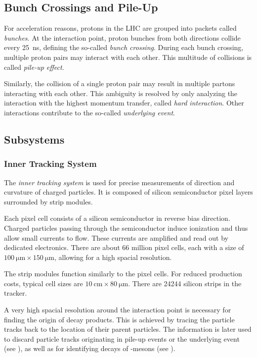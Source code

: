 \subsection{Bunch Crossings and Pile-Up}
\label{sec:pileup}

For acceleration reasons, protons in the \ac{LHC} are grouped into packets called \emph{bunches}. At the interaction point, proton bunches from both directions collide every \SI{25}{\nano\second}, defining the so-called \emph{bunch crossing}. During each bunch crossing, multiple proton pairs may interact with each other. This multitude of collisions is called \emph{pile-up effect}.

Similarly, the collision of a single proton pair may result in multiple partons interacting with each other. This ambiguity is resolved by only analyzing the interaction with the highest momentum transfer, called \emph{hard interaction}. Other interactions contribute to the so-called \emph{underlying event}.

\subsection{Subsystems}
\subsubsection{Inner Tracking System}
The \emph{inner tracking system} is used for precise measurements of direction and curvature of charged particles. 
It is composed of silicon semiconductor pixel layers surrounded by strip modules.

Each pixel cell consists of a silicon semiconductor in reverse bias direction. Charged particles passing through the semiconductor induce ionization and thus allow small currents to flow. These currents are amplified and read out by dedicated electronics. There are about \num{66} million pixel cells, each with a size of $\SI{100}{\micro\meter} \times \SI{150}{\micro\meter}$, allowing for a high spacial resolution.

The strip modules function similarly to the pixel cells. For reduced production costs, typical cell sizes are $\SI{10}{\centi\meter} \times \SI{80}{\micro\meter}$. There are \num{24244} silicon strips in the tracker.

A very high spacial resolution around the interaction point is necessary for finding the origin of decay products. This is achieved by tracing the particle tracks back to the location of their parent particles. The information is later used to discard particle tracks originating in pile-up  events or the underlying event (see ), as well as for identifying decays of \PB-mesons (see ).

